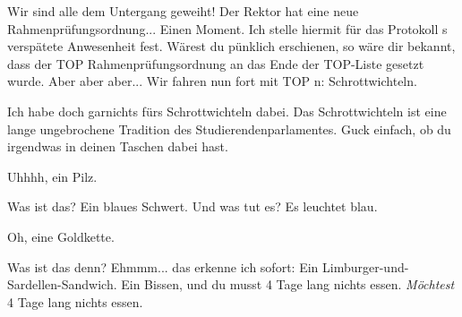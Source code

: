 \begin{verseplay}[7em]
\s{\Gandalf} Wir sind alle dem Untergang geweiht! Der Rektor hat  eine neue Rahmenprüfungsordnung...
\s{\Elron} Einen Moment. Ich stelle hiermit für das Protokoll \Gandalf{}s verspätete Anwesenheit fest. Wärest du pünklich erschienen, so wäre dir bekannt, dass der TOP Rahmenprüfungsordnung an das Ende der TOP-Liste gesetzt wurde.
\s{\Gandalf} Aber aber aber...
\s{\Elron}  Wir fahren nun fort mit TOP n: Schrottwichteln.
\end{verseplay}
\begin{verseplay}[7em]
\s{\Frodo} Ich habe doch garnichts fürs Schrottwichteln dabei.
\s{\Elron} Das Schrottwichteln ist eine lange ungebrochene Tradition des Studierendenparlamentes. 
\s{\Sum} Guck einfach, ob du irgendwas in deinen Taschen dabei hast.
\end{verseplay}
\begin{verseplay}[7em]
\s{\Gandalf} Uhhhh, ein Pilz. 
\end{verseplay}
\begin{verseplay}[7em]
\s{\Gimli} Was ist das?
\s{\Sum} Ein blaues Schwert.
\s{\Gimli} Und was tut es?
\s{\Sum} Es leuchtet blau. 
\end{verseplay}
\begin{verseplay}[7em]
\s{\Frodo} Oh, eine Goldkette. 
\end{verseplay}
\begin{verseplay}[7em]
\s{\Gimli}  Was ist das denn?
\s{\Frodo} Ehmmm... das erkenne ich sofort: Ein Limburger-und-Sardellen-Sandwich. Ein Bissen, und du musst 4 Tage lang nichts essen.
\s{\Elron}  \emph{Möchtest} 4 Tage lang nichts essen.
\end{verseplay}
